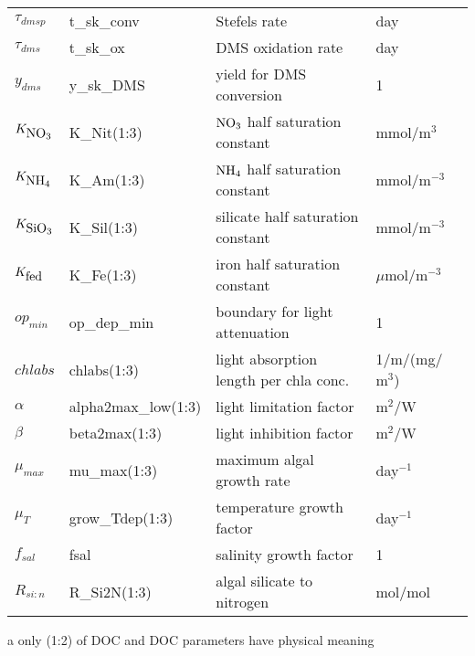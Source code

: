 \begin{table}[t!]
\begin{threeparttable}
\begin{tabular}{l|l|l|l|l}
$\tau_{dmsp}$ & t\_sk\_conv & Stefels rate & day \\
$\tau_{dms}$ & t\_sk\_ox & DMS oxidation rate  & day\\
$y_{dms}$ & y\_sk\_DMS & yield for DMS conversion & 1 \\
$K_{\mbox{NO$_3$}}$ & K\_Nit(1:3) & $\mbox{NO$_3$}$ half saturation constant  &
mmol/m$^{3}$\\
$K_{\mbox{NH$_4$}}$ & K\_Am(1:3) & $\mbox{NH$_4$}$ half saturation constant  & mmol/m$^{-3}$ \\
$K_{\mbox{SiO$_3$}}$ & K\_Sil(1:3) & silicate half saturation constant & mmol/m$^{-3}$  \\
$K_{\mbox{fed}}$ & K\_Fe(1:3) & iron half saturation constant  & $\mu$mol/m$^{-3}$ \\
$op_{min}$ & op\_dep\_min & boundary for light attenuation & 1\\
$chlabs$ & chlabs(1:3) & light absorption length per chla  conc.& 1$/$m$/$(mg$/$m$^{3}$) \\
$\alpha$ & alpha2max\_low(1:3) & light limitation factor & m$^2$/W \\
$\beta$ & beta2max(1:3) & light inhibition factor & m$^2$/W \\
$\mu_{max}$ & mu\_max(1:3) & maximum algal growth rate & day$^{-1}$ \\
$\mu_T$ & grow\_Tdep(1:3) & temperature growth factor & day$^{-1}$ \\
$f_{sal}$ & fsal & salinity  growth factor  & 1 \\
$R_{si:n}$ & R\_Si2N(1:3) & algal silicate to nitrogen &
mol/mol \\ \hline
\end{tabular}
\begin{tablenotes}
\item[a] {only (1:2) of DOC and DOC parameters have physical meaning} \\
\end{tablenotes}
\end{threeparttable}
\label{table:bio_tracers2}
\end{table}

